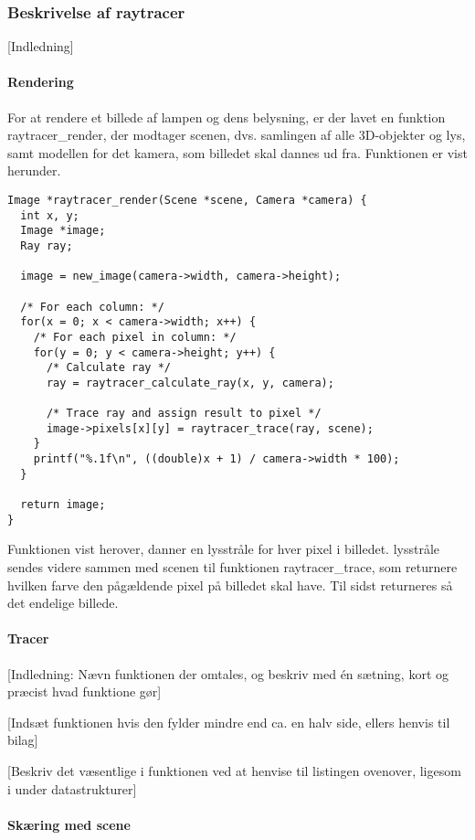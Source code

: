 \subsubsection{Beskrivelse af raytracer}
[Indledning]
\paragraph{Rendering}
For at rendere et billede af lampen og dens belysning, er der lavet en funktion raytracer\_render, der modtager scenen, dvs. samlingen af alle 3D-objekter og lys, samt modellen for det kamera, som billedet skal dannes ud fra. Funktionen er vist herunder.

\begin{lstlisting}[style=Cstyle, caption=Funktionen der rendere billedet af scenen med et kameras perspektiv]
Image *raytracer_render(Scene *scene, Camera *camera) {
  int x, y;
  Image *image;
  Ray ray;

  image = new_image(camera->width, camera->height);
  
  /* For each column: */
  for(x = 0; x < camera->width; x++) {
    /* For each pixel in column: */
    for(y = 0; y < camera->height; y++) {
      /* Calculate ray */
      ray = raytracer_calculate_ray(x, y, camera);
      
      /* Trace ray and assign result to pixel */
      image->pixels[x][y] = raytracer_trace(ray, scene);
    }
    printf("%.1f\n", ((double)x + 1) / camera->width * 100);
  }

  return image;
}
\end{lstlisting}

Funktionen vist herover, danner en lysstråle for hver pixel i billedet. lysstråle sendes videre sammen med scenen til funktionen raytracer\_trace, som returnere hvilken farve den pågældende pixel på billedet skal have. Til sidst returneres så det endelige billede.

\paragraph{Tracer}
[Indledning: Nævn funktionen der omtales, og beskriv med én sætning, kort og præcist hvad funktione gør]

[Indsæt funktionen hvis den fylder mindre end ca. en halv side, ellers henvis til bilag]

[Beskriv det væsentlige i funktionen ved at henvise til listingen ovenover, ligesom i under datastrukturer]
 
\paragraph{Skæring med scene}

